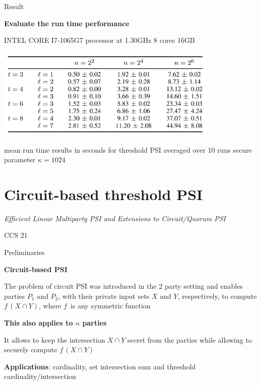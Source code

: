 \begin{frame}{Result}

    \centering \textbf{Evaluate the run time performance}

    \vspace{0.5cm}
    \centering INTEL CORE I7-1065G7 processor at 1.30GHz 8 cores 16GB

    \vspace{0.5cm}

    \centering\includegraphics[width=0.8\textwidth]{figure/TMPSI.png}

    \centering mean run time results in seconds for threshold PSI
    averaged over 10 runs secure parameter $\kappa = 1024$


\end{frame}




\section{Circuit-based threshold PSI}
\begin{frame}
    \centering \textit{Efficient Linear Multiparty PSI and Extensions to Circuit/Quorum PSI}

    \vspace{1cm}
    CCS 21
\end{frame}

\begin{frame}{Preliminaries}

    \textbf{Circuit-based PSI}
    
    \vspace{0.5cm}

    The problem of circuit PSI was introduced in the
    2 party setting and enables parties $P_1$ and $P_2$, with their private input sets $X$ and $Y$, respectively, to compute $f \, (X \cap Y)$, where $f \,$
    is any symmetric function
    
    \textbf{This also applies to $n$ parties}
    
    \vspace{0.25cm}

    It allows to keep the
    intersection $X \cap Y$ secret from the parties while allowing to securely compute $f \, (X \cap Y)$ 

    \vspace{0.5cm}

    \textbf{Applications}: cardinality, set intersection sum and
    threshold cardinality/intersection

\end{frame}

